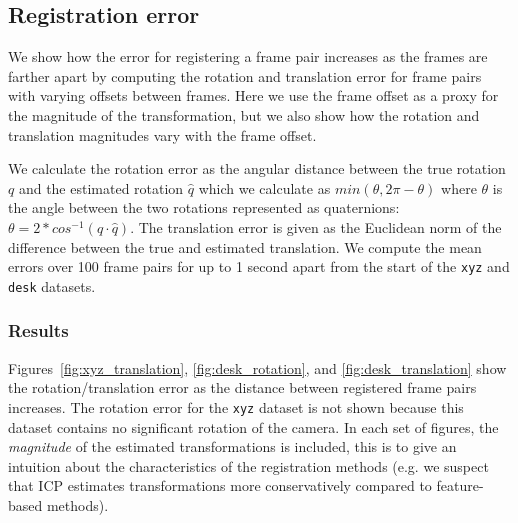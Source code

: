 \documentclass[a4paper]{article}
\begin{document}
\subsection{Registration error}
\label{registration_error}

We show how the error for registering a frame pair increases as the frames are farther apart by computing the rotation and translation error for frame pairs with varying offsets between frames. Here we use the frame offset as a proxy for the magnitude of the transformation, but we also show how the rotation and translation magnitudes vary with the frame offset.

We calculate the rotation error as the angular distance between the true rotation $q$ and the estimated rotation $\hat q$ which we calculate as $min(\theta, 2\pi - \theta)$ where $\theta$ is the angle between the two rotations represented as quaternions: $\theta = 2 * cos^{-1}(q \cdot \hat q)$. %
The translation error is given as the Euclidean norm of the difference between the true and estimated translation. We compute the mean errors over 100 frame pairs for up to 1 second apart from the start of the \texttt{xyz} and \texttt{desk} datasets.

\subsubsection{Results}

Figures~\ref{fig:xyz_translation}, \ref{fig:desk_rotation}, and \ref{fig:desk_translation} show the rotation/translation error as the distance between registered frame pairs increases. The rotation error for the \texttt{xyz} dataset is not shown because this dataset contains no significant rotation of the camera. In each set of figures, the \emph{magnitude} of the estimated transformations is included, this is to give an intuition about the characteristics of the registration methods (e.g. we suspect that \ac{ICP} estimates transformations more conservatively compared to feature-based methods). 
\end{document}
